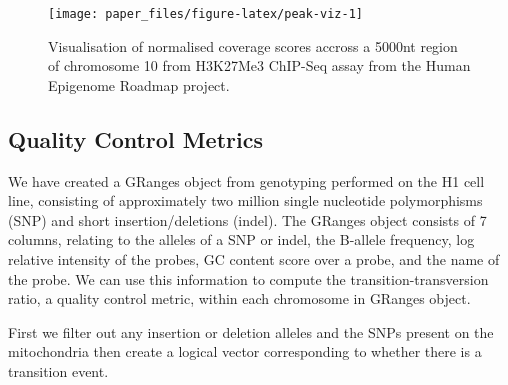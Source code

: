 \documentclass[10pt,letterpaper]{article}
\newenvironment{Shaded}{\begin{snugshade}}{\end{snugshade}}
\newcommand{\KeywordTok}[1]{\textcolor[rgb]{0.13,0.29,0.53}{\textbf{#1}}}
\newcommand{\DataTypeTok}[1]{\textcolor[rgb]{0.13,0.29,0.53}{#1}}
\newcommand{\StringTok}[1]{\textcolor[rgb]{0.31,0.60,0.02}{#1}}
\newcommand{\OperatorTok}[1]{\textcolor[rgb]{0.81,0.36,0.00}{\textbf{#1}}}
\newcommand{\NormalTok}[1]{#1}
\begin{document}
\begin{figure}

{\centering \texttt{[image: paper\_files/figure-latex/peak-viz-1]} 

}

\caption{Visualisation of normalised coverage scores accross a 5000nt region of chromosome 10 from H3K27Me3 ChIP-Seq assay from the Human Epigenome Roadmap project.}\label{fig:peak-viz}
\end{figure}

\subsection{Quality Control Metrics}\label{quality-control-metrics}

We have created a GRanges object from genotyping performed on the H1
cell line, consisting of approximately two million single nucleotide
polymorphisms (SNP) and short insertion/deletions (indel). The GRanges
object consists of 7 columns, relating to the alleles of a SNP or indel,
the B-allele frequency, log relative intensity of the probes, GC content
score over a probe, and the name of the probe. We can use this
information to compute the transition-transversion ratio, a quality
control metric, within each chromosome in GRanges object.

First we filter out any insertion or deletion alleles and the SNPs
present on the mitochondria then create a logical vector corresponding
to whether there is a transition event.

\begin{Shaded}
\end{Shaded}
\end{document}
